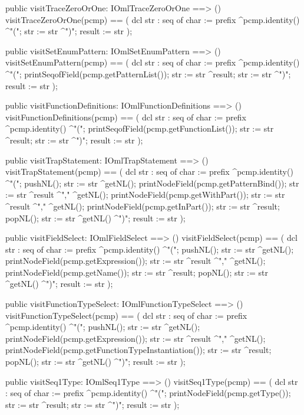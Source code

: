 \begin{vdm_al}
  public visitTraceZeroOrOne: IOmlTraceZeroOrOne ==> ()
  visitTraceZeroOrOne(pcmp) ==
    ( dcl str : seq of char := prefix ^pcmp.identity() ^"(";
      str := str ^")";
      result := str );

  public visitSetEnumPattern: IOmlSetEnumPattern ==> ()
  visitSetEnumPattern(pcmp) ==
    ( dcl str : seq of char := prefix ^pcmp.identity() ^"(";
      printSeqofField(pcmp.getPatternList());
      str := str ^result;
      str := str ^")";
      result := str );

  public visitFunctionDefinitions: IOmlFunctionDefinitions ==> ()
  visitFunctionDefinitions(pcmp) ==
    ( dcl str : seq of char := prefix ^pcmp.identity() ^"(";
      printSeqofField(pcmp.getFunctionList());
      str := str ^result;
      str := str ^")";
      result := str );

  public visitTrapStatement: IOmlTrapStatement ==> ()
  visitTrapStatement(pcmp) ==
    ( dcl str : seq of char := prefix ^pcmp.identity() ^"(";
      pushNL();
      str := str ^getNL();
      printNodeField(pcmp.getPatternBind());
      str := str ^result ^"," ^getNL();
      printNodeField(pcmp.getWithPart());
      str := str ^result ^"," ^getNL();
      printNodeField(pcmp.getInPart());
      str := str ^result;
      popNL();
      str := str ^getNL() ^")";
      result := str );

  public visitFieldSelect: IOmlFieldSelect ==> ()
  visitFieldSelect(pcmp) ==
    ( dcl str : seq of char := prefix ^pcmp.identity() ^"(";
      pushNL();
      str := str ^getNL();
      printNodeField(pcmp.getExpression());
      str := str ^result ^"," ^getNL();
      printNodeField(pcmp.getName());
      str := str ^result;
      popNL();
      str := str ^getNL() ^")";
      result := str );

  public visitFunctionTypeSelect: IOmlFunctionTypeSelect ==> ()
  visitFunctionTypeSelect(pcmp) ==
    ( dcl str : seq of char := prefix ^pcmp.identity() ^"(";
      pushNL();
      str := str ^getNL();
      printNodeField(pcmp.getExpression());
      str := str ^result ^"," ^getNL();
      printNodeField(pcmp.getFunctionTypeInstantiation());
      str := str ^result;
      popNL();
      str := str ^getNL() ^")";
      result := str );

  public visitSeq1Type: IOmlSeq1Type ==> ()
  visitSeq1Type(pcmp) ==
    ( dcl str : seq of char := prefix ^pcmp.identity() ^"(";
      printNodeField(pcmp.getType());
      str := str ^result;
      str := str ^")";
      result := str );


\end{vdm_al}
